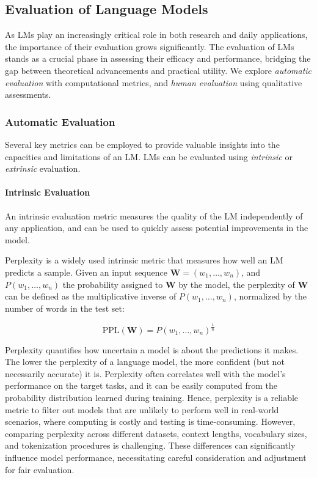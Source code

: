 \subsection{Evaluation of Language Models}

As \acp{LM} play an increasingly critical role in both research and daily applications, the importance of their evaluation grows significantly. The evaluation of \acp{LM} stands as a crucial phase in assessing their efficacy and performance, bridging the gap between theoretical advancements and practical utility. We explore \textit{automatic evaluation} with computational metrics, and \textit{human evaluation} using qualitative assessments. 

\subsubsection{Automatic Evaluation} 

Several key metrics can be employed to provide valuable insights into the capacities and limitations of an \ac{LM}. \acp{LM} can be evaluated using \textit{intrinsic} or \textit{extrinsic} evaluation. 

\paragraph{Intrinsic Evaluation} An intrinsic evaluation metric measures the quality of the \ac{LM} independently of any application, and can be used to quickly assess potential improvements in the model.

Perplexity is a widely used intrinsic metric that measures how well an \ac{LM} predicts a sample. Given an input sequence $\bm{W} = (w_1, \ldots, w_n)$, and $P(w_1, \ldots, w_n)$ the probability assigned to $\bm{W}$ by the model, the perplexity of $\bm{W}$ can be defined as the multiplicative inverse of $P(w_1, \ldots, w_n)$, normalized by the number of words in the test set:

\begin{equation}
    \text{PPL}(\bm{W}) = P(w_1, \ldots, w_n)^{\frac{1}{n}}
\end{equation}

Perplexity quantifies how uncertain a model is about the predictions it makes. The lower the perplexity of a language model, the more confident (but not necessarily accurate) it is. Perplexity often correlates well with the model's performance on the target tasks, and it can be easily computed from the probability distribution learned during training. Hence, perplexity is a reliable metric to filter out models that are unlikely to perform well in real-world scenarios, where computing is costly and testing is time-consuming. However, comparing perplexity across different datasets, context lengths, vocabulary sizes, and tokenization procedures is challenging. These differences can significantly influence model performance, necessitating careful consideration and adjustment for fair evaluation.

